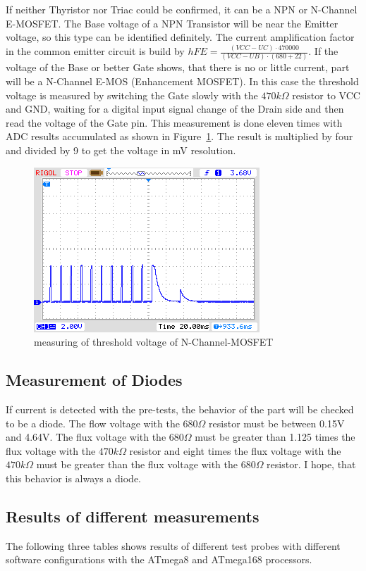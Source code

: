 If neither Thyristor nor Triac could be confirmed, it can be a NPN or N-Channel E-MOSFET.
The Base voltage of a NPN Transistor will be near the Emitter voltage, so this type can be identified definitely.
The current amplification factor in the common emitter circuit is build by \(hFE = \frac{(VCC-UC)\cdot 470000}{(VCC-UB)\cdot (680+22)}\).
If the voltage of the Base or better Gate  shows, that there is no or little current, part will be a N-Channel E-MOS 
(Enhancement MOSFET). In this case the threshold voltage is measured by switching the Gate slowly with
the \(470k\Omega\) resistor to VCC and GND, waiting for a digital input signal change of the Drain side and
then read the voltage of the Gate pin. This measurement is done eleven times with ADC results accumulated as
shown in Figure~\ref{fig:eleven}. The result is multiplied by four and divided by 9 to get the voltage in mV resolution.
\begin{figure}[H]
\centering
\includegraphics[]{../PNG/IRFU120gate.png}
\caption{measuring of threshold voltage of N-Channel-MOSFET}
\label{fig:eleven}
\end{figure}

\subsection{Measurement of Diodes}
\label{sec:diode}
If current is detected with the pre-tests, the behavior of the part will be checked to
be a diode. The flow voltage with the \(680\Omega\) resistor must be between 0.15V and 4.64V.
The flux voltage with the \(680\Omega\) must be greater than 1.125 times the flux voltage with
the \(470k\Omega\) resistor and eight times the flux voltage with the \(470k\Omega\) must be
greater than the flux voltage with the \(680\Omega\) resistor.
I hope, that this behavior is always a diode.

\subsection{Results of different measurements}
The following three tables shows results of different test probes with different
software configurations with the ATmega8 and ATmega168 processors.

